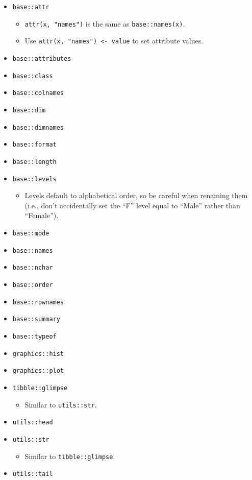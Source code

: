\documentclass[
]{book}
\providecommand{\tightlist}{%
  \setlength{\itemsep}{0pt}\setlength{\parskip}{0pt}}
\begin{document}
\begin{itemize}
\tightlist
\item
  \texttt{base::attr}

  \begin{itemize}
  \tightlist
  \item
    \texttt{attr(x,\ "names")} is the same as \texttt{base::names(x)}.
  \item
    Use \texttt{attr(x,\ "names")\ \textless{}-\ value} to set attribute values.
  \end{itemize}
\item
  \texttt{base::attributes}
\item
  \texttt{base::class}
\item
  \texttt{base::colnames}
\item
  \texttt{base::dim}
\item
  \texttt{base::dimnames}
\item
  \texttt{base::format}
\item
  \texttt{base::length}
\item
  \texttt{base::levels}

  \begin{itemize}
  \tightlist
  \item
    Levels default to alphabetical order, so be careful when renaming them (i.e., don't accidentally set the ``F'' level equal to ``Male'' rather than ``Female'').
  \end{itemize}
\item
  \texttt{base::mode}
\item
  \texttt{base::names}
\item
  \texttt{base::nchar}
\item
  \texttt{base::order}
\item
  \texttt{base::rownames}
\item
  \texttt{base::summary}
\item
  \texttt{base::typeof}
\item
  \texttt{graphics::hist}
\item
  \texttt{graphics::plot}
\item
  \texttt{tibble::glimpse}

  \begin{itemize}
  \tightlist
  \item
    Similar to \texttt{utils::str}.
  \end{itemize}
\item
  \texttt{utils::head}
\item
  \texttt{utils::str}

  \begin{itemize}
  \tightlist
  \item
    Similar to \texttt{tibble::glimpse}.
  \end{itemize}
\item
  \texttt{utils::tail}
\end{itemize}
\end{document}
